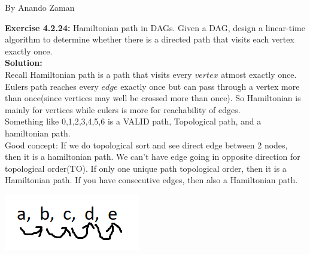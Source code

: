 \documentclass[11pt,fleqn]{article}
\begin{document}
By Anando Zaman

\textbf{Exercise 4.2.24:} Hamiltonian path in DAGs. Given a DAG, design a linear-time algorithm to
determine whether there is a directed path that visits each vertex exactly once.\\

\textbf{Solution:}\\
Recall Hamiltonian path is a path that visits every $vertex$ atmost exactly once. Eulers path reaches every $edge$ exactly once but can pass through a vertex more than once(since vertices may well be crossed more than once). So Hamiltonian is mainly for vertices while eulers is more for reachability of edges.\\

Something like 0,1,2,3,4,5,6 is a VALID path, Topological path, and a hamiltonian path.\\

Good concept: If we do topological sort and see direct edge between 2 nodes, then it is a hamiltonian path. We can't have edge going in opposite direction for topological order(TO). If only one unique path topological order, then it is a Hamiltonian path. If you have consecutive edges, then also a Hamiltonian path.

\begin{center}
	\includegraphics[scale=1]{4.2.24.png}
\end{center}

	
\end{document}

